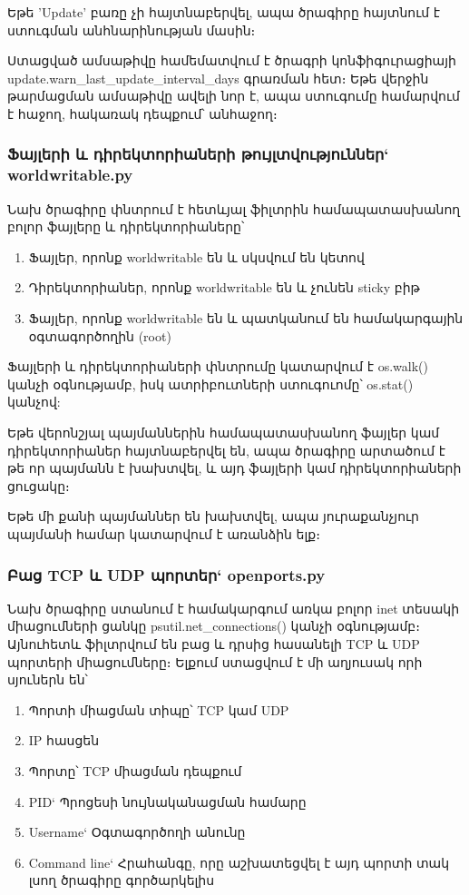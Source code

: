 \documentclass[12pt]{article}
\begin{document}
\begin{sloppypar}
\begin{itemize}
	Եթե 'Update' բառը չի հայտնաբերվել, ապա ծրագիրը հայտնում է ստուգման անհնարինության մասին։
\end{itemize}

Ստացված ամսաթիվը համեմատվում է ծրագրի կոնֆիգուրացիայի
update.warn\_last\_update\_interval\_days
գրառման հետ։ Եթե վերջին թարմացման ամսաթիվը ավելի նոր է,
ապա ստուգումը համարվում է հաջող, հակառակ դեպքում՝ անհաջող։


\subsubsection{Ֆայլերի և դիրեկտորիաների թույլտվություններ` worldwritable.py}


Նախ ծրագիրը փնտրում է հետևյալ ֆիլտրին համապատասխանող բոլոր ֆայլերը և դիրեկտորիաները՝

\begin{enumerate}
\item Ֆայլեր, որոնք worldwritable են և սկսվում են կետով
\item Դիրեկտորիաներ, որոնք worldwritable են և չունեն sticky բիթ
\item Ֆայլեր, որոնք worldwritable են և պատկանում են համակարգային օգտագործողին (root)
\end{enumerate}

Ֆայլերի և դիրեկտորիաների փնտրումը կատարվում է os.walk() կանչի օգնությամբ,
իսկ ատրիբուտների ստուգուոմը՝ os.stat() կանչով:

Եթե վերոնշյալ պայմաններին համապատասխանող ֆայլեր կամ դիրեկտորիաներ հայտնաբերվել են,
ապա ծրագիրը արտածում է թե որ պայմանն է խախտվել, և այդ ֆայլերի կամ դիրեկտորիաների
ցուցակը։

Եթե մի քանի պայմաններ են խախտվել, ապա յուրաքանչյուր պայմանի համար կատարվում է
առանձին ելք։


\subsubsection{Բաց TCP և UDP պորտեր` openports.py}


Նախ ծրագիրը ստանում է համակարգում առկա բոլոր inet տեսակի միացումների ցանկը
psutil.net\_connections() կանչի օգնությամբ։
Այնուհետև ֆիլտրվում են բաց և դրսից հասանելի TCP և UDP պորտերի միացումները։
Ելքում ստացվում է մի աղյուսակ որի սյուներն են՝

\begin{enumerate}
\item Պորտի միացման տիպը՝ TCP կամ UDP
\item IP հասցեն
\item Պորտը՝ TCP միացման դեպքում
\item PID` Պրոցեսի նույնականացման համարը
\item Username` Օգտագործողի անունը
\item Command line` Հրահանգը, որը աշխատեցվել է այդ պորտի տակ լսող ծրագիրը
	գործարկելիս
\end{enumerate}



\end{sloppypar}
\end{document}
